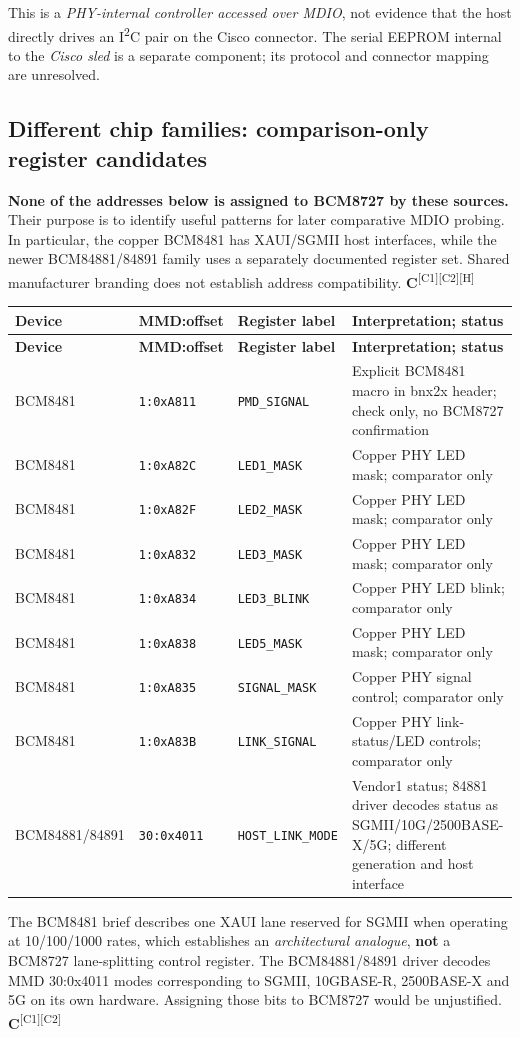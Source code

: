 \documentclass[10pt,a4paper]{article}
\newcommand{\m}[1]{\textsf{\color{blue}\bfseries #1}}
\newcommand{\src}[1]{\textsuperscript{[#1]}}
\begin{document}
This is a \emph{PHY-internal controller accessed over MDIO}, not evidence that the host directly drives an I\textsuperscript{2}C pair on the Cisco connector. The serial EEPROM internal to the \emph{Cisco sled} is a separate component; its protocol and connector mapping are unresolved.

\subsection{Different chip families: comparison-only register candidates}
\textbf{None of the addresses below is assigned to BCM8727 by these sources.} Their purpose is to identify useful patterns for later comparative MDIO probing. In particular, the copper BCM8481 has XAUI/SGMII host interfaces, while the newer BCM84881/84891 family uses a separately documented register set. Shared manufacturer branding does not establish address compatibility. \m{C}\src{C1}\src{C2}\src{H}
\small
\begin{longtable}{@{}p{38mm}p{21mm}p{35mm}p{65mm}@{}}\toprule
\textbf{Device} & \textbf{MMD:offset} & \textbf{Register label} & \textbf{Interpretation; status}\\\midrule\endfirsthead
\toprule \textbf{Device} & \textbf{MMD:offset} & \textbf{Register label} & \textbf{Interpretation; status}\\\midrule\endhead
BCM8481 & \texttt{1:0xA811} & \texttt{PMD\_SIGNAL} & Explicit BCM8481 macro in bnx2x header; check only, no BCM8727 confirmation \\
BCM8481 & \texttt{1:0xA82C} & \texttt{LED1\_MASK} & Copper PHY LED mask; comparator only \\
BCM8481 & \texttt{1:0xA82F} & \texttt{LED2\_MASK} & Copper PHY LED mask; comparator only \\
BCM8481 & \texttt{1:0xA832} & \texttt{LED3\_MASK} & Copper PHY LED mask; comparator only \\
BCM8481 & \texttt{1:0xA834} & \texttt{LED3\_BLINK} & Copper PHY LED blink; comparator only \\
BCM8481 & \texttt{1:0xA838} & \texttt{LED5\_MASK} & Copper PHY LED mask; comparator only \\
BCM8481 & \texttt{1:0xA835} & \texttt{SIGNAL\_MASK} & Copper PHY signal control; comparator only \\
BCM8481 & \texttt{1:0xA83B} & \texttt{LINK\_SIGNAL} & Copper PHY link-status/LED controls; comparator only \\
BCM84881/84891 & \texttt{30:0x4011} & \texttt{HOST\_LINK\_MODE} & Vendor1 status; 84881 driver decodes status as SGMII/10G/2500BASE-X/5G; different generation and host interface \\
\bottomrule\end{longtable}
\normalsize
The BCM8481 brief describes one XAUI lane reserved for SGMII when operating at 10/100/1000 rates, which establishes an \emph{architectural analogue}, \textbf{not} a BCM8727 lane-splitting control register. The BCM84881/84891 driver decodes MMD 30:0x4011 modes corresponding to SGMII, 10GBASE-R, 2500BASE-X and 5G on its own hardware. Assigning those bits to BCM8727 would be unjustified. \m{C}\src{C1}\src{C2}
\end{document}
